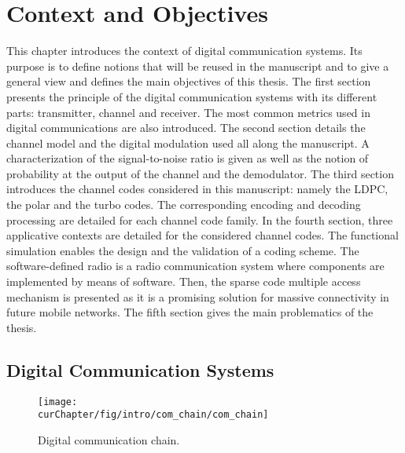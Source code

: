 
\newcommand{\curChapter}{main/chapter1}

\chapter{Context and Objectives}
\label{chap:ctx}

This chapter introduces the context of digital communication systems. Its
purpose is to define notions that will be reused in the manuscript and to give
a general view and defines the main objectives of this thesis. The first section
presents the principle of the digital communication systems with its different
parts: transmitter, channel and receiver. The most common metrics used in
digital communications are also introduced. The second section details the
channel model and the digital modulation used all along the manuscript. A
characterization of the signal-to-noise ratio is given as well as the notion of
probability at the output of the channel and the demodulator. The third section
introduces the channel codes considered in this manuscript: namely the LDPC, the
polar and the turbo codes. The corresponding encoding and decoding processing
are detailed for each channel code family. In the fourth section, three
applicative contexts are detailed for the considered channel codes. The
functional simulation enables the design and the validation of a coding scheme.
The software-defined radio is a radio communication system where components are
implemented by means of software. Then, the sparse code multiple access
mechanism is presented as it is a promising solution for massive connectivity in
future mobile networks. The fifth section gives the main problematics of the
thesis.

\vspace*{\fill}
\minitoccustom
\vspace*{\fill}

\section{Digital Communication Systems}
\label{sec:ctx_digital_communication_systems}

\begin{figure}[htp]
  \centering
  \texttt{[image: \\curChapter/fig/intro/com\_chain/com\_chain]}
  \caption{Digital communication chain.}
  \label{fig:ctx_com_chain}
\end{figure}

